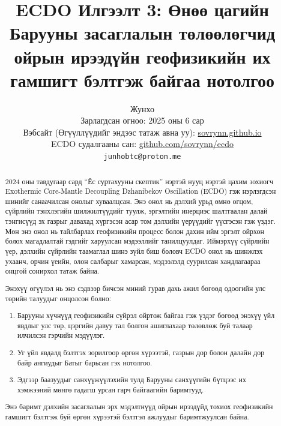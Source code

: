 \documentclass[10pt,twocolumn,letterpaper]{article}
\begin{document}
\title{ECDO Илгээлт 3: Өнөө цагийн Барууны засаглалын төлөөлөгчид ойрын ирээдүйн геофизикийн их гамшигт бэлтгэж байгаа нотолгоо}

\author{Жунхо\\
Зарлагдсан огноо: 2025 оны 6 сар\\
Вэбсайт (Өгүүллүүдийг эндээс татаж авна уу): \href{https://sovrynn.github.io}{sovrynn.github.io}\\
ECDO судалгааны сан: \href{https://github.com/sovrynn/ecdo}{github.com/sovrynn/ecdo}\\
{\tt\small junhobtc@proton.me}
}

\maketitle

\begin{abstract}

\begin{flushleft}
2024 оны тавдугаар сард “Ёс суртахууны скептик” \cite{0} нэртэй нууц нэртэй цахим зохиогч Exothermic Core-Mantle Decoupling Dzhanibekov Oscillation (ECDO) \cite{1} гэж нэрлэгдсэн шинийг санаачилсан онолыг хуваалцсан. Энэ онол нь дэлхий урьд өмнө огцом, сүйрлийн тэнхлэгийн шилжилтүүдийг туулж, эргэлтийн инерциэс шалтгаалан далай тэнгисүүд эх газрыг давахад хүргэсэн асар том дэлхийн үерүүдийг үүсгэсэн гэж үздэг. Мөн энэ онол нь тайлбарлах геофизикийн процесс болон дахин ийм эргэлт ойрхон болох магадлалтай гэдгийг харуулсан мэдээллийг танилцуулдаг. Иймэрхүү сүйрлийн үер, дэлхийн сүйрлийн таамаглал шинэ зүйл биш боловч ECDO онол нь шинжлэх ухаанч, орчин үеийн, олон салбарыг хамарсан, мэдээлэлд суурилсан хандлагаараа онцгой сонирхол татаж байна.

Энэхүү өгүүлэл нь энэ сэдвээр бичсэн миний гурав дахь ажил \cite{2,3} бөгөөд одоогийн улс төрийн талуудыг онцолсон болно:
\begin{enumerate}
    \item Барууны хүчнүүд геофизикийн сүйрэл ойртож байгаа гэж үздэг бөгөөд энэхүү үйл явдлыг улс төр, цэргийн давуу тал болгон ашиглахаар төлөвлөж буй талаар илчилсэн гэрчийн мэдүүлэг.
    \item Уг үйл явдалд бэлтгэх зорилгоор өргөн хүрээтэй, газрын дор болон далайн дор байр ангиудыг Батыг барьсан гэх нотолгоо.
    \item Эдгээр баазуудыг санхүүжүүлэхийн тулд Барууны санхүүгийн бүтцээс их хэмжээний мөнгө гадагш урсан гарч байгаагийн баримтууд.
\end{enumerate}
\end{flushleft}
Энэ баримт дэлхийн засаглалын эрх мэдэлтнүүд ойрын ирээдүйд тохиох геофизикийн гамшигт бэлтгэж буй өргөн хүрээтэй бэлтгэл ажлуудыг баримтжуулсан байна.
\end{abstract}
\end{document}
